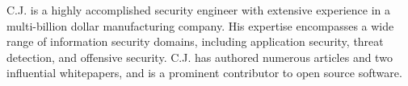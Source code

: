 C.J. is a highly accomplished security engineer with extensive experience in a multi-billion dollar manufacturing company. His expertise encompasses a wide range of information security domains, including application security, threat detection, and offensive security. C.J. has authored numerous articles and two influential whitepapers, and is a prominent contributor to open source software.
